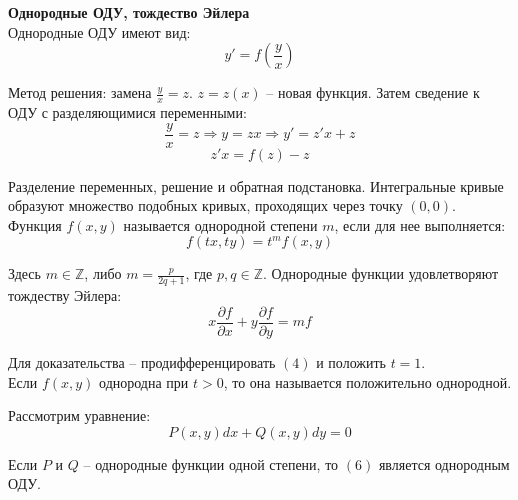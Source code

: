 \documentclass{article}
\begin{document}
	
	\textbf{Однородные ОДУ, тождество Эйлера}\\

	Однородные ОДУ имеют вид:
	\begin{equation}
		y' = f(\frac{y}{x})
	\end{equation}

	Метод решения: замена $\frac{y}{x}=z$. $z=z(x)$ -- новая функция. Затем сведение к ОДУ с разделяющимися переменными:
	\begin{equation}
		\frac{y}{x}=z \Rightarrow y = zx \Rightarrow y' = z'x + z
	\end{equation}
	\begin{equation}
		z'x = f(z) - z
	\end{equation}

	Разделение переменных, решение и обратная подстановка. Интегральные кривые образуют множество подобных кривых, проходящих через точку $(0,0)$.\\

	Функция $f(x,y)$ называется однородной степени $m$, если для нее выполняется:
	\begin{equation}
		f(tx,ty) = t^mf(x,y)
	\end{equation}

	Здесь $m\in\mathbb{Z}$, либо $m=\frac{p}{2q+1}$, где $p, q \in\mathbb{Z}$. Однородные функции удовлетворяют тождеству Эйлера:
	\begin{equation}
		x\frac{\partial f}{\partial x} + y\frac{\partial f}{\partial y} = mf
	\end{equation}

	Для доказательства -- продифференцировать $(4)$ и положить $t=1$.\\


	Если $f(x,y)$ однородна при $t>0$, то она называется положительно однородной.

	Рассмотрим уравнение:
	\begin{equation}
		P(x,y)dx + Q(x,y)dy = 0
	\end{equation}

	Если $P$ и $Q$ -- однородные функции одной степени, то $(6)$ является однородным ОДУ.
\end{document}
